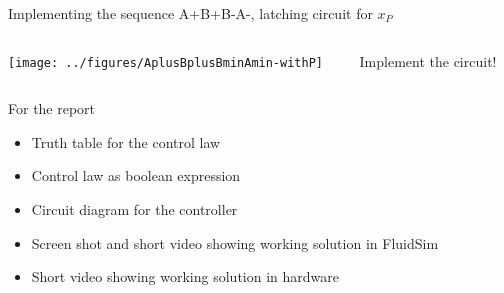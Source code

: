 \documentclass[presentation,aspectratio=1610]{beamer}
\begin{document}
\begin{frame}[label={sec:orge4b7ee1}]{Implementing the sequence A+B+B-A-, latching circuit for \(x_P\)}
\begin{columns}
\begin{column}{0.3\columnwidth}
\begin{center}
\texttt{[image: ../figures/AplusBplusBminAmin-withP]}
\end{center}
\end{column}

\begin{column}{0.7\columnwidth}
\begin{LaTeX}
\begin{center}
\end{center}
\end{LaTeX}

Implement the circuit!
\end{column}
\end{columns}
\end{frame}

\begin{frame}[label={sec:orga7db220}]{For the report}
\begin{itemize}
\item Truth table for the control law
\item Control law as boolean expression
\item Circuit diagram for the controller
\item Screen shot and short video showing working solution in FluidSim
\item Short video showing working solution in hardware
\end{itemize}
\end{frame}
\end{document}
